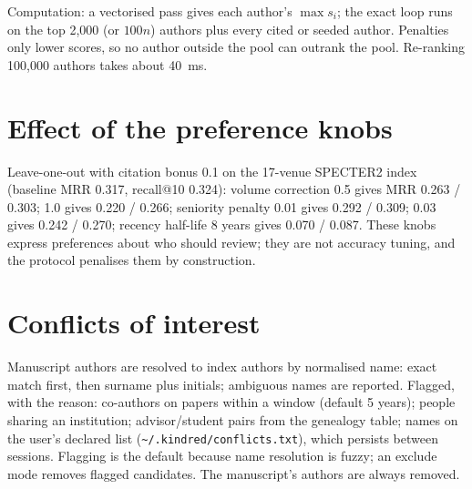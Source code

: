 \documentclass[11pt]{article}
\begin{document}
Computation: a vectorised pass gives each author's $\max s_i$; the exact loop runs on the top 2{,}000 (or $100n$) authors plus every cited or seeded author. Penalties only lower scores, so no author outside the pool can outrank the pool. Re-ranking 100{,}000 authors takes about 40~ms.

\section{Effect of the preference knobs}\label{app:knobs}
Leave-one-out with citation bonus 0.1 on the 17-venue SPECTER2 index (baseline MRR 0.317, recall@10 0.324):
volume correction 0.5 gives MRR 0.263 / 0.303; 1.0 gives 0.220 / 0.266; seniority penalty 0.01 gives 0.292 / 0.309; 0.03 gives 0.242 / 0.270; recency half-life 8 years gives 0.070 / 0.087. These knobs express preferences about who should review; they are not accuracy tuning, and the protocol penalises them by construction.

\section{Conflicts of interest}\label{app:coi}
Manuscript authors are resolved to index authors by normalised name: exact match first, then surname plus initials; ambiguous names are reported. Flagged, with the reason: co-authors on papers within a window (default 5 years); people sharing an institution; advisor/student pairs from the genealogy table; names on the user's declared list (\texttt{\textasciitilde/.kindred/conflicts.txt}), which persists between sessions. Flagging is the default because name resolution is fuzzy; an exclude mode removes flagged candidates. The manuscript's authors are always removed.
\end{document}
